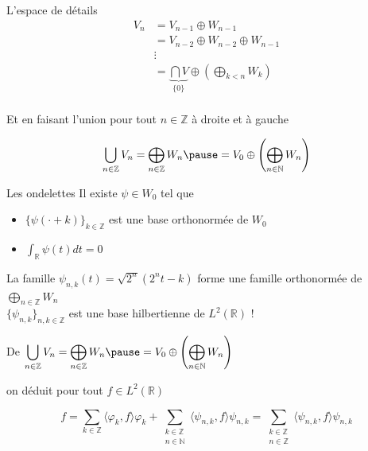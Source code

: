 \documentclass[french]{beamer}
\begin{document}
\begin{frame}{L'espace de détails}
	\begin{align*}
		V_n &= V_{n-1} \oplus W_{n-1} \\
		&= V_{n-2} \oplus W_{n-2} \oplus W_{n-1} \\
		&\vdots \\
		&= \underbrace{\bigcap V}_{\{0\}} \oplus \left(\bigoplus_{k < n} W_k\right) \\
	\end{align*}

	\pause
	Et en faisant l'union pour tout $n \in \mathbb{Z}$ à droite et à gauche

	\pause
	$$\bigcup_{n \in \mathbb{Z}} V_n = \bigoplus_{n \in \mathbb{Z}} W_n \pause = V_0 \oplus \left(\bigoplus_{n \in \mathbb{N}} W_n\right)$$
\end{frame}

\begin{frame}{Les ondelettes}
	Il existe $\psi \in W_0$ tel que \\
	\pause
	\begin{itemize}
		\item $\{\psi(\cdot + k)\}_{k \in \mathbb{Z}}$ est une base orthonormée de $W_0$
		\pause
		\item $\displaystyle \int_{\mathbb{R}} \psi(t) dt = 0$ \\
	\end{itemize}
	\pause	
	
	La famille $\psi_{n, k}(t) = \sqrt{2^n}(2^n t - k)$ forme une famille orthonormée de $\displaystyle \bigoplus_{n \in \mathbb{Z}} W_n$\\
	\pause
	$\{\psi_{n, k}\}_{n, k \in \mathbb{Z}}$ est une base hilbertienne de $L^2(\mathbb{R})$ !
\end{frame}

\begin{frame}
	De $\displaystyle \bigcup_{n \in \mathbb{Z}} V_n = \bigoplus_{n \in \mathbb{Z}} W_n \pause = V_0 \oplus \left(\bigoplus_{n \in \mathbb{N}} W_n\right)$

	on déduit pour tout $f \in L^2(\mathbb{R})$
	
	$$f = \sum_{k \in \mathbb{Z}} \langle \varphi_k, f \rangle \varphi_k + \sum_{\substack{k \in \mathbb{Z} \\ n \in \mathbb{N}}} \langle \psi_{n, k}, f \rangle \psi_{n, k} = \sum_{\substack{k \in \mathbb{Z} \\ n \in \mathbb{Z}}} \langle \psi_{n, k}, f \rangle \psi_{n, k}$$
\end{frame}
\end{document}
